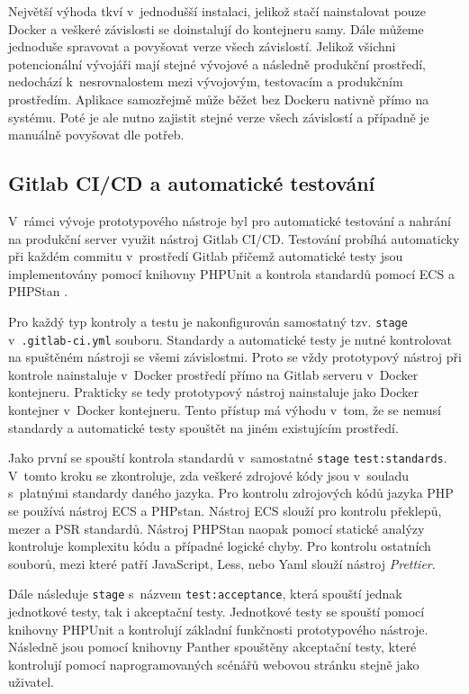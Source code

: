 \documentclass[czech,master]{diploma}
\begin{document}
Největší výhoda tkví v~jednodušší instalaci, jelikož stačí nainstalovat pouze Docker a veškeré závislosti se doinstalují do kontejneru samy. Dále můžeme jednoduše spravovat a povyšovat verze všech závislostí. Jelikož všichni potencionální vývojáři mají stejné vývojové a následně produkční prostředí, nedochází k~nesrovnalostem mezi vývojovým, testovacím a produkčním prostředím. Aplikace samozřejmě může běžet bez Dockeru nativně přímo na systému. Poté je ale nutno zajistit stejné verze všech závislostí a případně je manuálně povyšovat dle potřeb.

\subsection{Gitlab CI/CD a automatické testování}
V~rámci vývoje prototypového nástroje byl pro automatické testování a nahrání na produkční server využit nástroj Gitlab CI/CD.  Testování probíhá automaticky při každém commitu v~prostředí Gitlab přičemž automatické testy jsou implementovány pomocí knihovny PHPUnit \cite{PHPUnit} a kontrola standardů pomocí ECS \cite{ECS} a PHPStan \cite{PHPStan}.

Pro každý typ kontroly a testu je nakonfigurován samostatný tzv. \texttt{stage} v~\texttt{.gitlab-ci.yml} souboru. Standardy a automatické testy je nutné kontrolovat na spuštěném nástroji se všemi závislostmi. Proto se vždy prototypový nástroj při kontrole nainstaluje v~Docker prostředí přímo na Gitlab serveru v~Docker kontejneru. Prakticky se tedy prototypový nástroj nainstaluje jako Docker kontejner v~Docker kontejneru. Tento přístup má výhodu v~tom, že se nemusí standardy a automatické testy spouštět na jiném existujícím prostředí. 

Jako první se spouští kontrola standardů v~samostatné \texttt{stage} \texttt{test:standards}. V~tomto kroku se zkontroluje, zda veškeré zdrojové kódy jsou v~souladu s~platnými standardy daného jazyka. Pro kontrolu zdrojových kódů jazyka PHP se používá nástroj ECS a PHPstan. Nástroj ECS slouží pro kontrolu překlepů, mezer a PSR standardů. Nástroj PHPStan naopak pomocí statické analýzy kontroluje komplexitu kódu a případné logické chyby. Pro kontrolu ostatních souborů, mezi které patří JavaScript, Less, nebo Yaml slouží nástroj \textit{Prettier}.

Dále následuje \texttt{stage} s~názvem \texttt{test:acceptance}, která spouští jednak jednotkové testy, tak i akceptační testy. Jednotkové testy se spouští pomocí knihovny PHPUnit a kontrolují základní funkčnosti prototypového nástroje. Následně jsou pomocí knihovny Panther spouštěny akceptační testy, které kontrolují pomocí naprogramovaných scénářů webovou stránku stejně jako uživatel.
\end{document}

